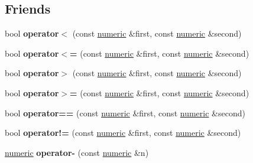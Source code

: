 \subsection*{Friends}
\begin{DoxyCompactItemize}
\item 
\mbox{\label{classdialog_1_1numeric_a6c82f5a4ef6f97fb03418e27300602d4}} 
bool {\bfseries operator$<$} (const \hyperlink{classdialog_1_1numeric}{numeric} \&first, const \hyperlink{classdialog_1_1numeric}{numeric} \&second)
\item 
\mbox{\label{classdialog_1_1numeric_af71924db8be9a3f0a4936719577d5227}} 
bool {\bfseries operator$<$=} (const \hyperlink{classdialog_1_1numeric}{numeric} \&first, const \hyperlink{classdialog_1_1numeric}{numeric} \&second)
\item 
\mbox{\label{classdialog_1_1numeric_ac674523b335e8f0c3c571f733bb37287}} 
bool {\bfseries operator$>$} (const \hyperlink{classdialog_1_1numeric}{numeric} \&first, const \hyperlink{classdialog_1_1numeric}{numeric} \&second)
\item 
\mbox{\label{classdialog_1_1numeric_ae22fb96337fe91f00a232e6e03e20775}} 
bool {\bfseries operator$>$=} (const \hyperlink{classdialog_1_1numeric}{numeric} \&first, const \hyperlink{classdialog_1_1numeric}{numeric} \&second)
\item 
\mbox{\label{classdialog_1_1numeric_abd70fb9565f5b9a95c94c15f321bd8b4}} 
bool {\bfseries operator==} (const \hyperlink{classdialog_1_1numeric}{numeric} \&first, const \hyperlink{classdialog_1_1numeric}{numeric} \&second)
\item 
\mbox{\label{classdialog_1_1numeric_aceea9758af2e3783f6e4bb05bef5444c}} 
bool {\bfseries operator!=} (const \hyperlink{classdialog_1_1numeric}{numeric} \&first, const \hyperlink{classdialog_1_1numeric}{numeric} \&second)
\item 
\mbox{\label{classdialog_1_1numeric_a7091833bec4182a5e775fc659493fa24}} 
\hyperlink{classdialog_1_1numeric}{numeric} {\bfseries operator-\/} (const \hyperlink{classdialog_1_1numeric}{numeric} \&n)
\item 

\end{DoxyCompactItemize}
